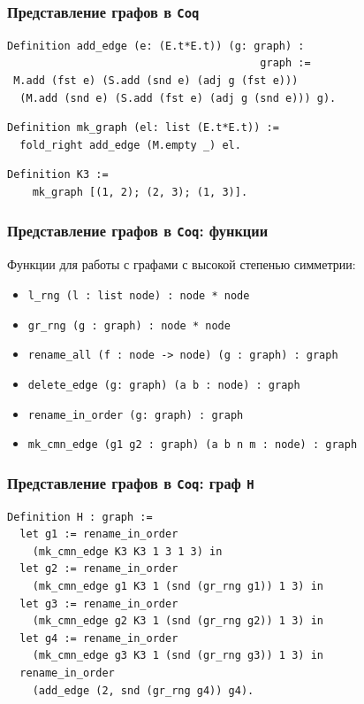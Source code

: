 \documentclass[14pt]{beamer}
\begin{document}
\begin{frame}[fragile]
\frametitle{Представление графов в {\tt Coq}}

{\small 
\begin{verbatim}
Definition add_edge (e: (E.t*E.t)) (g: graph) : 
                                        graph :=
 M.add (fst e) (S.add (snd e) (adj g (fst e))) 
  (M.add (snd e) (S.add (fst e) (adj g (snd e))) g).
\end{verbatim}
}

\begin{verbatim}
Definition mk_graph (el: list (E.t*E.t)) :=
  fold_right add_edge (M.empty _) el.
\end{verbatim}

\begin{verbatim}
Definition K3 := 
    mk_graph [(1, 2); (2, 3); (1, 3)].
\end{verbatim}
\end{frame}

\begin{frame}[fragile]
\frametitle{Представление графов в {\tt Coq}: функции}
Функции для работы с графами с высокой степенью симметрии:
\begin{itemize}
    \item {\tt l\_rng (l : list node) : node * node}
    \item {\tt gr\_rng (g : graph) : node * node}
    \item {\tt rename\_all (f : node -> node) (g : graph) : graph}
    \item {\tt delete\_edge (g: graph) (a b : node) : graph}
    \item {\tt rename\_in\_order (g: graph) : graph}
    \item {\tt mk\_cmn\_edge (g1 g2 : graph) (a b n m : node) : graph}
\end{itemize}
\end{frame}

\begin{frame}[fragile]
\frametitle{Представление графов в {\tt Coq}: граф {\tt H}}

{\small 
\begin{verbatim}
Definition H : graph := 
  let g1 := rename_in_order 
    (mk_cmn_edge K3 K3 1 3 1 3) in
  let g2 := rename_in_order 
    (mk_cmn_edge g1 K3 1 (snd (gr_rng g1)) 1 3) in
  let g3 := rename_in_order 
    (mk_cmn_edge g2 K3 1 (snd (gr_rng g2)) 1 3) in
  let g4 := rename_in_order 
    (mk_cmn_edge g3 K3 1 (snd (gr_rng g3)) 1 3) in
  rename_in_order 
    (add_edge (2, snd (gr_rng g4)) g4).
\end{verbatim}
}
\end{frame}
\end{document}
